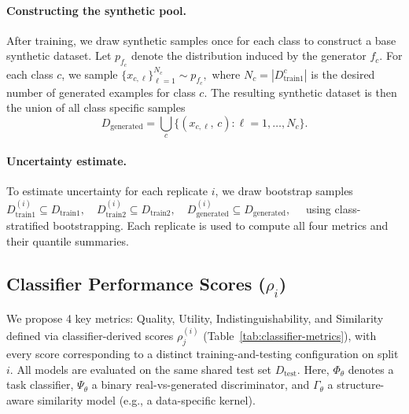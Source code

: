 \paragraph{Constructing the synthetic pool.}
After training, we draw synthetic samples once for each class to construct a
base synthetic dataset. Let \(p_{f_c}\) denote the distribution induced by the generator \(f_c\). For each class \(c\), we sample
$
\{x_{c,\ell}\}_{\ell=1}^{N_c} \sim p_{f_c},
$ where \(N_c = |D_{\text{train1}}^{c}|\) is the desired number of generated examples for class \(c\).
The resulting synthetic dataset is then the union of all class specific samples
\[
D_{\text{generated}}
= \bigcup_{c}
\{(x_{c,\ell},\, c) : \ell = 1,\ldots,N_c\}.
\]



\paragraph{Uncertainty estimate.}
To estimate uncertainty for each replicate \(i\), we draw bootstrap samples
$
D_{\text{train1}}^{(i)} \subseteq D_{\text{train1}},\quad
D_{\text{train2}}^{(i)} \subseteq D_{\text{train2}},\quad
D_{\text{generated}}^{(i)} \subseteq D_{\text{generated}},\quad
$
using class-stratified bootstrapping.
Each replicate is used to compute all four metrics and their quantile summaries.


\subsection{Classifier Performance Scores (\texorpdfstring{$\rho_i$}{rho\_i})}
We propose 4 key metrics: Quality, Utility, Indistinguishability, and Similarity defined via classifier-derived scores $\rho^{(i)}_j$ (Table~\ref{tab:classifier-metrics}), with every score corresponding to a distinct training-and-testing configuration on split $i$. All models are evaluated on the same shared test set $D_{\text{test}}$. Here, $\Phi_\theta$ denotes a task classifier, $\Psi_\theta$ a binary real-vs-generated discriminator, and $\Gamma_\theta$ a structure-aware similarity model (e.g., a data-specific kernel).

